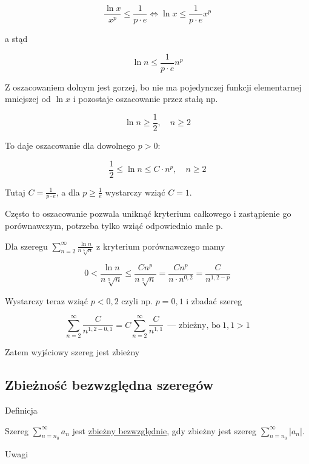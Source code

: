 $$ \frac{\ln x}{x^p} \leq \frac{1}{p \cdot e} \Leftrightarrow \ln x \leq \frac{1}{p \cdot e} x^p $$

a stąd

$$ \ln n \leq \frac{1}{p \cdot e} n^p $$

Z oszacowaniem dolnym jest gorzej, bo nie ma pojedynczej funkcji elementarnej mniejszej od $\ln x$ i pozostaje oszacowanie
przez stałą np.

$$ \ln n \geq \frac{1}{2}, \quad n \geq 2  $$

To daje oszacowanie dla dowolnego $p>0$:

$$ \frac{1}{2} \leq \ln n \leq C \cdot n^p, \quad n \geq 2 $$

Tutaj $ C = \frac{1}{p \cdot e} $, a dla $ p \geq \frac{1}{e} $ wystarczy wziąć $C = 1$.

Często to oszacowanie pozwala uniknąć kryterium całkowego i zastąpienie go porównawczym, potrzeba tylko wziąć
odpowiednio małe p. \\

\begin{przyklad}

Dla szeregu $ \sum\limits_{n = 2}^{\infty} \frac{\ln n}{n \sqrt[5]{n}} $ z kryterium porównawczego mamy

$$ 0 < \frac{\ln n}{n \sqrt[5]{n}} \leq \frac{Cn^p}{n \sqrt[5]{n}} = \frac{Cn^p}{n \cdot n^{0,2}} = \frac{C}{n^{1,2 - p}} $$

Wystarczy teraz wziąć $p < 0,2$ czyli np. $p = 0,1$ i zbadać szereg

$$ \sum\limits_{n=2}^{\infty} \frac{C}{n^{1,2 - 0,1}} = C \sum\limits_{n=2}^{\infty} \frac{C}{n^{1,1}} 
\ \ \textrm{--- zbieżny, bo} \ 1,1 > 1$$

Zatem wyjściowy szereg jest zbieżny
\end{przyklad}


\subsection*{Zbieżność bezwzględna szeregów}

\begin{tw}{Definicja}

Szereg $ \sum\limits_{n=n_0}^{\infty} a_n$ jest \underline{zbieżny bezwzględnie}, gdy zbieżny jest szereg
$ \sum\limits_{n=n_0}^{\infty} |a_n|$.
\end{tw}

Uwagi

